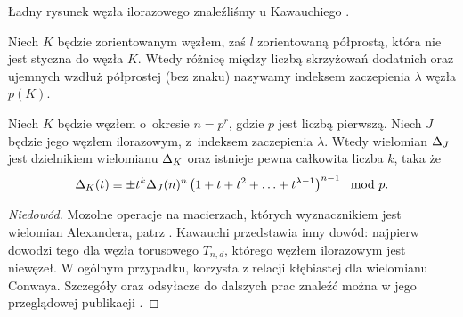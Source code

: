 Ładny rysunek węzła ilorazowego znaleźliśmy u Kawauchiego \cite[s. 122]{kawauchi1996}.

\begin{definition}
    Niech $K$ będzie zorientowanym węzłem, zaś $l$ zorientowaną półprostą, która nie jest styczna do węzła $K$.
    Wtedy różnicę między liczbą skrzyżowań dodatnich oraz ujemnych wzdłuż półprostej (bez znaku) nazywamy indeksem zaczepienia $\lambda$ węzła $p(K)$.
\end{definition}

\begin{proposition}
%
\label{prp:murasugi_periodic}%
    Niech $K$ będzie węzłem o~okresie $n = p^r$, gdzie $p$ jest liczbą pierwszą.
    Niech $J$ będzie jego węzłem ilorazowym, z~indeksem zaczepienia $\lambda$.
    Wtedy wielomian $\Delta_J$ jest dzielnikiem wielomianu $\Delta_K$ oraz istnieje pewna całkowita liczba $k$, taka że
    \begin{equation}
        \Delta_K(t) \equiv \pm t^k \Delta_J(n)^n \left(1 + t + t^2 + \ldots + t^{\lambda - 1}\right)^{n-1} \mod p.
    \end{equation}
\end{proposition}

\begin{proof}[Niedowód]
    Mozolne operacje na macierzach, których wyznacznikiem jest wielomian Alexandera, patrz \cite{murasugi1971}.
    Kawauchi przedstawia inny dowód: najpierw dowodzi tego dla węzła torusowego $T_{n, d}$, którego węzłem ilorazowym jest niewęzeł.
    W ogólnym przypadku, korzysta z relacji kłębiastej dla wielomianu Conwaya.
    Szczegóły oraz odsyłacze do dalszych prac znaleźć można w jego przeglądowej publikacji \cite[s. 122-124]{kawauchi1996}.
\end{proof}


